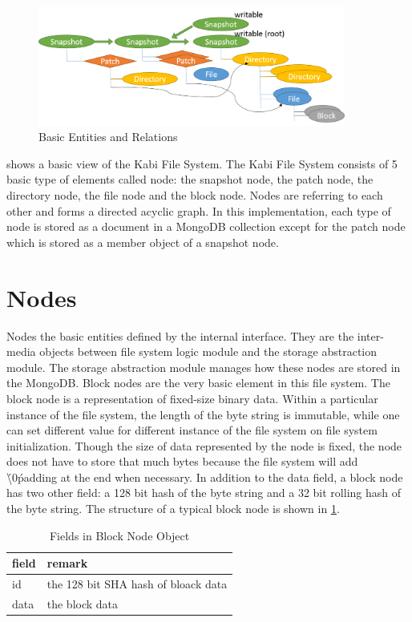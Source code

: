 \begin{figure}[hbtp]
\centering
\includegraphics[width=0.9\textwidth]{Chapter-3/figs/fig2.png}
\caption{Basic Entities and Relations}
\label{fig:basic_entities}
\end{figure}

     shows a basic view of the Kabi File System. The Kabi File System consists of 5 basic type of elements called node: the snapshot node, the patch node, the directory node, the file node and the block node. Nodes are referring to each other and forms a directed acyclic graph. In this implementation, each type of node is stored as a document in a MongoDB collection except for the patch node which is stored as a member object of a snapshot node. 

\section{Nodes}
    Nodes the basic entities defined by the internal interface. They are the inter-media objects between file system logic module and the storage abstraction module. The storage abstraction module manages how these nodes are stored in the MongoDB.
Block nodes are the very basic element in this file system. The block node is a representation of fixed-size binary data. Within a particular instance of the file system, the length of the byte string is immutable, while one can set different value for different instance of the file system on file system initialization. Though the size of data represented by the node is fixed, the node does not have to store that much bytes because the file system will add \'\textbackslash0\' padding at the end when necessary. In addition to the data field, a block node has two other field: a 128 bit hash of the byte string and a 32 bit rolling hash of the byte string. The structure of a typical block node is shown in \ref{tab:block_fields}.

\begin{table}
\caption{Fields in Block Node Object}
\label{tab:block_fields}
\begin{center}
\begin{tabular}{ll}
\toprule
field & remark\\
\midrule
id & the 128 bit SHA hash of bloack data\\
data & the block data\\
\bottomrule
\end{tabular}
\end{center}
\end{table}

